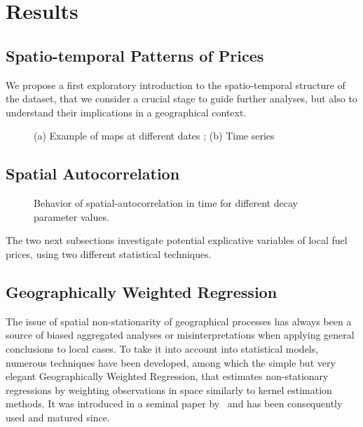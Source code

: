 \documentclass[3p,times,procedia]{elsarticle}
\begin{document}
\section{Results}


\subsection{Spatio-temporal Patterns of Prices}


We propose a first exploratory introduction to the spatio-temporal structure of the dataset, that we consider a crucial stage to guide further analyses, but also to understand their implications in a geographical context.

\begin{figure}
\centering

\caption{(a) Example of maps at different dates ; (b) Time series}
\end{figure}


\subsection{Spatial Autocorrelation}




\begin{figure}
\centering

\caption{Behavior of spatial-autocorrelation in time for different decay parameter values.}
\end{figure}


The two next subsections investigate potential explicative variables of local fuel prices, using two different statistical techniques.

\subsection{Geographically Weighted Regression}

The issue of spatial non-stationarity of geographical processes has always been a source of biased aggregated analyses or misinterpretations when applying general conclusions to local cases. To take it into account into statistical models, numerous techniques have been developed, among which the simple but very elegant Geographically Weighted Regression, that estimates non-stationary regressions by weighting observations in space similarly to kernel estimation methods. It was introduced in a seminal paper by~\cite{brunsdon1996geographically} and has been consequently used and matured since.
\end{document}
